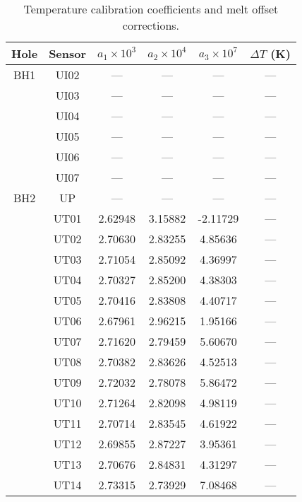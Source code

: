 \documentclass[utf8]{article}
\begin{document}
    \begin{table}
      \caption{%
        Temperature calibration coefficients and melt offset corrections.}
      \label{tab:calibration}
      \scalebox{0.75}
      {\begin{tabular}{cccccc}
        \hline
        Hole & Sensor & $a_1\times10^{3}$ & $a_2\times10^{4}$ & $a_3\times10^{7}$ & $\Delta T$ (K) \\
        \hline
        BH1 & UI02 &   ---   &   ---   &   ---   &     ---   \\
            & UI03 &   ---   &   ---   &   ---   &     ---   \\
            & UI04 &   ---   &   ---   &   ---   &     ---   \\
            & UI05 &   ---   &   ---   &   ---   &     ---   \\
            & UI06 &   ---   &   ---   &   ---   &     ---   \\
            & UI07 &   ---   &   ---   &   ---   &     ---   \\
        \hline
        BH2 & UP   &   ---   &   ---   &   ---   &     ---   \\
            & UT01 & 2.62948 & 3.15882 &-2.11729 &     ---   \\
            & UT02 & 2.70630 & 2.83255 & 4.85636 &     ---   \\
            & UT03 & 2.71054 & 2.85092 & 4.36997 &     ---   \\
            & UT04 & 2.70327 & 2.85200 & 4.38303 &     ---   \\
            & UT05 & 2.70416 & 2.83808 & 4.40717 &     ---   \\
            & UT06 & 2.67961 & 2.96215 & 1.95166 &     ---   \\
            & UT07 & 2.71620 & 2.79459 & 5.60670 &     ---   \\
            & UT08 & 2.70382 & 2.83626 & 4.52513 &     ---   \\
            & UT09 & 2.72032 & 2.78078 & 5.86472 &     ---   \\
            & UT10 & 2.71264 & 2.82098 & 4.98119 &     ---   \\
            & UT11 & 2.70714 & 2.83545 & 4.61922 &     ---   \\
            & UT12 & 2.69855 & 2.87227 & 3.95361 &     ---   \\
            & UT13 & 2.70676 & 2.84831 & 4.31297 &     ---   \\
            & UT14 & 2.73315 & 2.73929 & 7.08468 &     ---   \\

\end{tabular}}
\end{table}
\end{document}
